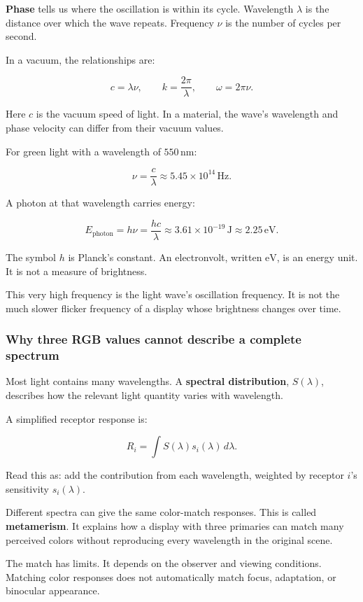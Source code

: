 \textbf{Phase} tells us where the oscillation is within its cycle. Wavelength \(\lambda\) is the distance over which the wave repeats. Frequency \(\nu\) is the number of cycles per second.

In a vacuum, the relationships are:

\[
c=\lambda\nu,\qquad
k=\frac{2\pi}{\lambda},\qquad
\omega=2\pi\nu.
\]

Here \(c\) is the vacuum speed of light. In a material, the wave's wavelength and phase velocity can differ from their vacuum values.

For green light with a wavelength of \(550\,\mathrm{nm}\):

\[
\nu=\frac{c}{\lambda}
\approx 5.45\times10^{14}\,\mathrm{Hz}.
\]

A photon at that wavelength carries energy:

\[
E_{\mathrm{photon}}=h\nu=\frac{hc}{\lambda}
\approx 3.61\times10^{-19}\,\mathrm{J}
\approx 2.25\,\mathrm{eV}.
\]

The symbol \(h\) is Planck's constant. An electronvolt, written \(\mathrm{eV}\), is an energy unit. It is not a measure of brightness.

This very high frequency is the light wave's oscillation frequency. It is not the much slower flicker frequency of a display whose brightness changes over time.

\subsubsection{Why three RGB values cannot describe a complete spectrum}\label{04-visual-computing-ii-ch043-why-three-rgb-values-cannot-describe-a-complete-spectrum}

Most light contains many wavelengths. A \textbf{spectral distribution}, \(S(\lambda)\), describes how the relevant light quantity varies with wavelength.

A simplified receptor response is:

\[
R_i=\int S(\lambda)s_i(\lambda)\,d\lambda.
\]

Read this as: add the contribution from each wavelength, weighted by receptor \(i\)'s sensitivity \(s_i(\lambda)\).

Different spectra can give the same color-match responses. This is called \textbf{metamerism}. It explains how a display with three primaries can match many perceived colors without reproducing every wavelength in the original scene.

The match has limits. It depends on the observer and viewing conditions. Matching color responses does not automatically match focus, adaptation, or binocular appearance.

